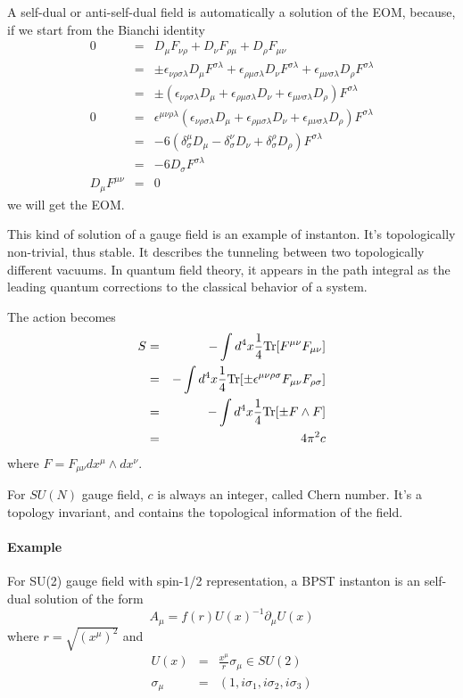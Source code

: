 \documentclass[12pt]{book}
\begin{document}
	A self-dual or anti-self-dual field is automatically a solution of the EOM, because, if we start from the Bianchi identity
	\begin{eqnarray}
		0&=&D_\mu F_{\nu\rho}+D_\nu F_{\rho\mu}+D_\rho F_{\mu\nu}\\
		&=&\pm\epsilon_{\nu\rho\sigma\lambda}D_\mu F^{\sigma\lambda}+\epsilon_{\rho\mu\sigma\lambda}D_\nu F^{\sigma\lambda}+\epsilon_{\mu\nu\sigma\lambda}D_\rho F^{\sigma\lambda}\\
		&=&\pm(\epsilon_{\nu\rho\sigma\lambda}D_\mu+\epsilon_{\rho\mu\sigma\lambda}D_\nu+\epsilon_{\mu\nu\sigma\lambda}D_\rho)F^{\sigma\lambda}\\
		0&=&\epsilon^{\mu\nu\rho\lambda}(\epsilon_{\nu\rho\sigma\lambda}D_\mu+\epsilon_{\rho\mu\sigma\lambda}D_\nu+\epsilon_{\mu\nu\sigma\lambda}D_\rho)F^{\sigma\lambda}\\
		&=&-6(\delta^\mu_\sigma D_\mu- \delta^\nu_\sigma D_\nu+\delta^\rho_\sigma D_\rho)F^{\sigma\lambda}\\
		&=&-6D_\sigma F^{\sigma\lambda}\\
		D_\mu F^{\mu\nu}&=&0
	\end{eqnarray}
	we will get the EOM.
	
	This kind of solution of a gauge field is an example of instanton. It's topologically non-trivial, thus stable. It describes the tunneling between two topologically different vacuums. In quantum field theory, it appears in the path integral as the leading quantum corrections to the classical behavior of a system.
	
	The action becomes
	\begin{eqnarray}
		S&=&-\int d^4x\frac 14 {\rm Tr}[F^{\mu\nu}F_{\mu\nu}] \\
		&=&-\int d^4x\frac 14 {\rm Tr}[\pm\epsilon^{\mu\nu\rho\sigma}F_{\mu\nu}F_{\rho\sigma}]\\
		&=&-\int d^4x\frac 14 {\rm Tr}[\pm F\wedge F]\\
		&=&4\pi^2c
	\end{eqnarray}
	where $F=F_{\mu\nu}dx^\mu\wedge dx^\nu$.
	
	For $SU(N)$ gauge field, $c$ is always an integer, called Chern number. It's a topology invariant, and contains the topological information of the field.
	\paragraph{Example}For SU(2) gauge field with spin-1/2 representation, a BPST instanton \cite{BPST} is an self-dual solution of the form
		\begin{equation}
			A_\mu=f(r)U(x)^{-1}\partial_\mu U(x)
		\end{equation}
		where $r=\sqrt{(x^\mu)^2}$ and
		\begin{eqnarray}
			U(x)&=&\frac{x^\mu}r\sigma_\mu\in SU(2)\\
			\sigma_\mu&=&(1,i\sigma_1,i\sigma_2,i\sigma_3)
		\end{eqnarray}
		
\end{document}
